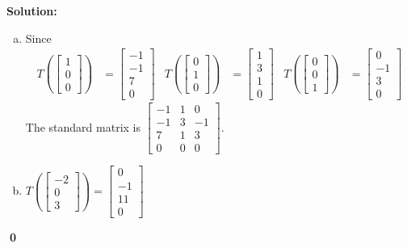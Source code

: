 \documentclass{article}
\newenvironment{solution}
{
  \ignorespaces
  \textbf{Solution:}
}
{
  \ignorespacesafterend
  \begin{flushright}
  {\bfseries \qed}
  \end{flushright}
}
\begin{document}
\begin{solution}
\begin{enumerate}[(a)]
\item Since 
\begin{align*}
T\left(\begin{bmatrix} 1 \\ 0 \\ 0 \end{bmatrix}\right) &= \begin{bmatrix} -1 \\ -1 \\ 7 \\0\end{bmatrix} &
T\left(\begin{bmatrix} 0 \\ 1 \\ 0 \end{bmatrix}\right) &= \begin{bmatrix} 1 \\ 3 \\ 1 \\0 \end{bmatrix}  &
T\left(\begin{bmatrix} 0 \\ 0 \\ 1 \end{bmatrix}\right) &= \begin{bmatrix} 0 \\ -1 \\ 3 \\ 0  \end{bmatrix}
\end{align*}
The standard matrix is \( \begin{bmatrix} -1 & 1 & 0 \\ -1 & 3 & -1 \\ 7 & 1 & 3  \\ 0 & 0 & 0 \end{bmatrix} \).
\item \( T\left( \begin{bmatrix}-2 \\ 0 \\ 3 \end{bmatrix} \right)  = \begin{bmatrix} 0 \\ -1 \\ 11 \\ 0 \end{bmatrix}\)
\end{enumerate}
\end{solution}
\end{document}
